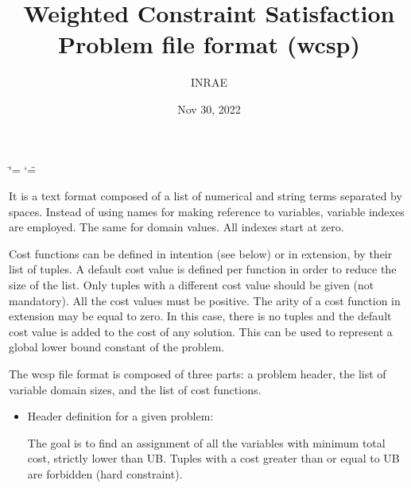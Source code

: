 \documentclass[letterpaper,10pt,openany,oneside,english]{sphinxmanual}
\title{Weighted Constraint Satisfaction Problem file format (wcsp)}
\date{Nov 30, 2022}
\author{INRAE}
\begin{document}
\ifdefined\shorthandoff
  \ifnum\catcode`\=\string=\active\shorthandoff{=}\fi
  \ifnum\catcode`\"=\active{}\fi
\fi

\pagestyle{empty}
\sphinxmaketitle
\pagestyle{plain}
\sphinxtableofcontents
\pagestyle{normal}
\label{\detokenize{formats/wcspformat::doc}}



\begin{fulllineitems}

\pysigstartsignatures
{}
\pysigstopsignatures
\sphinxAtStartPar
It is a text format composed of a list of numerical and string terms separated by spaces. Instead of using names for making reference to variables, variable indexes are employed. The same for domain values. All indexes start at zero.

\sphinxAtStartPar
Cost functions can be defined in intention (see below) or in extension, by their list of tuples. A default cost value is defined per function in order to reduce the size of the list. Only tuples with a different cost value should be given (not mandatory). All the cost values must be positive. The arity of a cost function in extension may be equal to zero. In this case, there is no tuples and the default cost value is added to the cost of any solution. This can be used to represent a global lower bound constant of the problem.

\sphinxAtStartPar
The wcsp file format is composed of three parts: a problem header, the list of variable domain sizes, and the list of cost functions.

\sphinxAtStartPar
\begin{itemize}
\item {} 
\sphinxAtStartPar
Header definition for a given problem: 
\begin{sphinxVerbatim}[commandchars=\\\{\}]
 
   
  
   
       
\end{sphinxVerbatim}
 The goal is to find an assignment of all the variables with minimum total cost, strictly lower than UB. Tuples with a cost greater than or equal to UB are forbidden (hard constraint).


\end{itemize}
\end{fulllineitems}
\end{document}
